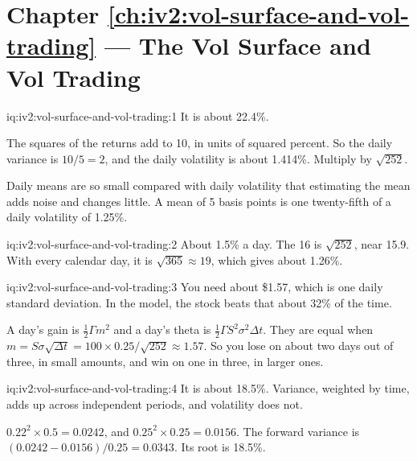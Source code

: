 \section*{Chapter \ref{ch:iv2:vol-surface-and-vol-trading} --- The Vol Surface and Vol Trading}

\begin{solution}{iq:iv2:vol-surface-and-vol-trading:1}
It is about 22.4\%.

The squares of the returns add to 10, in units of squared percent. So the daily variance is $10/5 = 2$, and the daily volatility is about 1.414\%. Multiply by $\sqrt{252}$.

Daily means are so small compared with daily volatility that estimating the mean adds noise and changes little. A mean of 5 basis points is one twenty-fifth of a daily volatility of 1.25\%.

\end{solution}

\begin{solution}{iq:iv2:vol-surface-and-vol-trading:2}
About 1.5\% a day. The 16 is $\sqrt{252}$, near 15.9. With every calendar day, it is $\sqrt{365} \approx 19$, which gives about 1.26\%.

\end{solution}

\begin{solution}{iq:iv2:vol-surface-and-vol-trading:3}
You need about \$1.57, which is one daily standard deviation. In the model, the stock beats that about 32\% of the time.

A day's gain is $\tfrac12\Gamma m^2$ and a day's theta is $\tfrac12\Gamma S^2\sigma^2\Delta t$. They are equal when $m = S\sigma\sqrt{\Delta t} = 100 \times 0.25/\sqrt{252} \approx 1.57$. So you lose on about two days out of three, in small amounts, and win on one in three, in larger ones.

\end{solution}

\begin{solution}{iq:iv2:vol-surface-and-vol-trading:4}
It is about 18.5\%. Variance, weighted by time, adds up across independent periods, and volatility does not.

$0.22^2 \times 0.5 = 0.0242$, and $0.25^2 \times 0.25 = 0.0156$. The forward variance is $(0.0242 - 0.0156)/0.25 = 0.0343$. Its root is 18.5\%.

\end{solution}

